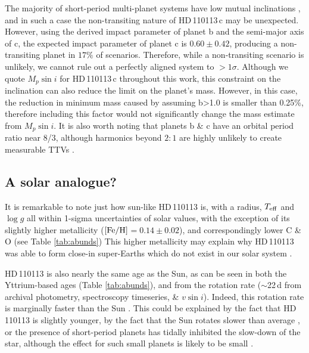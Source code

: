 \documentclass[fleqn,usenatbib]{mnras}
\newcommand{\vsini}{$v\sin{i}$}
\newcommand{\teff}{$T_{\rm eff}$}
\newcommand{\feh}{\mbox{$\rm [Fe/H]$}}
\newcommand{\logg}{$\log g$}
\newcommand{\Tstar}{HD\,110113}
\newcommand{\Tplanetc}{HD\,110113\,c}
\begin{document}
The majority of short-period multi-planet systems have low mutual inclinations \citep{lissauer2011architecture, 2012A&A...541A.139F}, and in such a case the non-transiting nature of \Tplanetc{} may be unexpected.
However, using the derived impact parameter of planet b and the semi-major axis of c, the expected impact parameter of planet c is $0.60\pm0.42$, producing a non-transiting planet in $17\%$ of scenarios.
Therefore, while a non-transiting scenario is unlikely, we cannot rule out a perfectly aligned system to $>1\sigma{}$.
Although we quote $M_p\sin{i}$ for \Tplanetc{} throughout this work, this constraint on the inclination can also reduce the limit on the planet's mass.
However, in this case, the reduction in minimum mass caused by assuming b>1.0 is smaller than 0.25\%, therefore including this factor would not significantly change the mass estimate from $M_p\sin{i}$.
It is also worth noting that planets b \& c have an orbital period ratio near 8/3, although harmonics beyond $2:1$ are highly unlikely to create measurable TTVs \citep{deck2015measurement}.

\subsection{A solar analogue?}
It is remarkable to note just how sun-like \Tstar{} is, with a radius, \teff{} and \logg{} all within 1-sigma uncertainties of solar values, with the exception of its slightly higher metallicity (\feh{}$ = 0.14\pm0.02$), and correspondingly lower C \& O (see Table \ref{tab:abunds}) \citep[e.g.][]{Franchini2020,2015A&A...576A..89B}
This higher metallicity may explain why \Tstar{} was able to form close-in super-Earths which do not exist in our solar system \citep{mulders2016super,bitsch2020influence}.

\Tstar{} is also nearly the same age as the Sun, as can be seen in both the Yttrium-based ages (Table \ref{tab:abunds}), and from the rotation rate ($\sim$22\,d from archival photometry, spectroscopy timeseries, \& \vsini{}).
Indeed, this rotation rate is marginally faster than the Sun \citep[25-26.5d when measured with HARPS-N and converted to sidereal period,][]{milbourne2019harps}.
This could be explained by the fact that \Tstar{} is slightly younger, by the fact that the Sun rotates slower than average \citep{2008ApJ...684..691R}, or the presence of short-period planets has tidally inhibited the slow-down of the star, although the effect for such small planets is likely to be small \citep{bolmont2012effect}.
\end{document}
